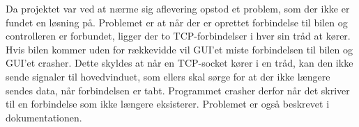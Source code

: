 Da projektet var ved at nærme sig aflevering opstod et problem, som der ikke er fundet en løsning på. Problemet er at når der er oprettet forbindelse til bilen og controlleren er forbundet, ligger der to TCP-forbindelser i hver sin tråd at kører. Hvis bilen kommer uden for rækkevidde vil GUI'et miste forbindelsen til bilen og GUI'et crasher. Dette skyldes at når en TCP-socket kører i en tråd, kan den ikke sende signaler til hovedvinduet, som ellers skal sørge for at der ikke længere sendes data, når forbindelsen er tabt. Programmet crasher derfor når det skriver til en forbindelse som ikke længere eksisterer. Problemet er også beskrevet i dokumentationen.